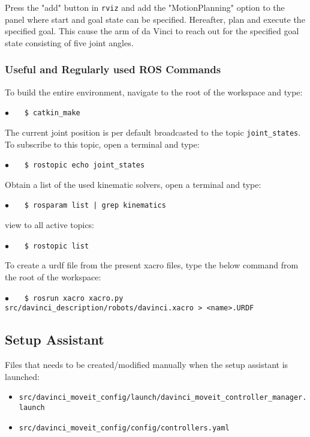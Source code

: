 Press the "add" button in \texttt{rviz} and add the "MotionPlanning" option to the panel where start and goal state can be specified. Hereafter, plan and execute the specified goal. This cause the arm of da Vinci to reach out for the specified goal state consisting of five joint angles.

\subsubsection*{Useful and Regularly used ROS Commands}
To build the entire environment, navigate to the root of the workspace and type:

\hspace{1cm} \textbf{$\bullet$} \ \ \  \texttt{\$ catkin\_make}%

The current joint position is per default broadcasted to the topic \texttt{joint\_states}. To subscribe to this topic, open a terminal and type:

\hspace{1cm} \textbf{$\bullet$} \ \ \  \texttt{\$ rostopic echo joint\_states} \ \ \ {} 

Obtain a list of the used kinematic solvers, open a terminal and type:

\hspace{1cm} \textbf{$\bullet$} \ \ \  \texttt{\$ rosparam list | grep kinematics} \ \ \ {} 

view to all active topics:

\hspace{1cm} \textbf{$\bullet$} \ \ \  \texttt{\$ rostopic list} \ \ \ {} 

To create a \gls{urdf} file from the present xacro files, type the below command from the root of the workspace:

\hspace{1cm} \textbf{$\bullet$} \ \ \  \texttt{\$ rosrun xacro xacro.py src/davinci\_description/robots/davinci.xacro > <name>.URDF} %
%
\subsection*{Setup Assistant}
Files that needs to be created/modified manually when the setup assistant is launched:
\begin{itemize}
	\item \texttt{src/davinci\_moveit\_config/launch/davinci\_moveit\_controller\_manager.launch}
	\item \texttt{src/davinci\_moveit\_config/config/controllers.yaml}
\end{itemize}


{}{}